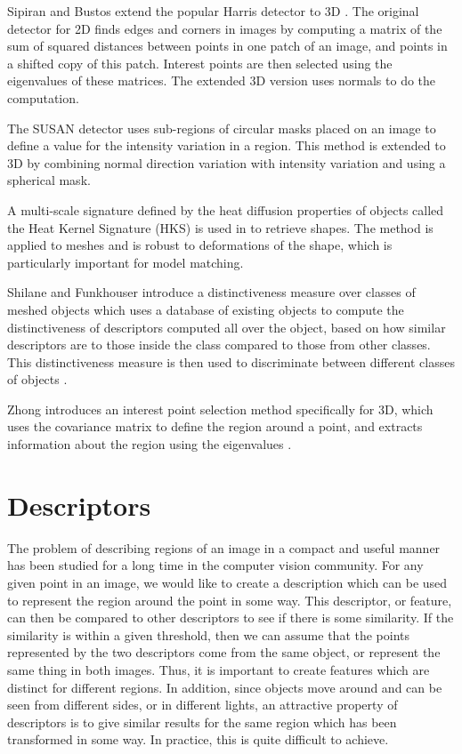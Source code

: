 \documentclass[11pt,a4paper]{kth-mag}
\begin{document}
Sipiran and Bustos extend the popular Harris detector \cite{harris1988combined}
to 3D \cite{sipiran2011harris}. The original detector for 2D finds edges and
corners in images by computing a matrix of the sum of squared distances between
points in one patch of an image, and points in a shifted copy of this patch.
Interest points are then selected using the eigenvalues of these matrices. The
extended 3D version uses normals to do the computation.

The SUSAN detector \cite{smith1997susan} uses sub-regions of circular masks
placed on an image to define a value for the intensity variation in a region.
This method is extended to 3D by combining normal direction variation with
intensity variation and using a spherical mask.

A multi-scale signature defined by the heat diffusion properties of objects 
called the Heat Kernel Signature (HKS) \cite{sun2009concise} is used in
\cite{ovsjanikov2009shape} to retrieve shapes. The method is applied to meshes
and is robust to deformations of the shape, which is particularly important for
model matching.

Shilane and Funkhouser introduce a distinctiveness measure over classes of
meshed objects which uses a database of existing objects to compute the
distinctiveness of descriptors computed all over the object, based on how
similar descriptors are to those inside the class compared to those from other
classes. This distinctiveness measure is then used to discriminate between
different classes of objects \cite{shilane2007distinctive}.

Zhong introduces an interest point selection method specifically for 3D, which
uses the covariance matrix to define the region around a point, and extracts
information about the region using the eigenvalues \cite{zhong2009intrinsic}.

\section{Descriptors}
The problem of describing regions of an image in a compact and useful manner has
been studied for a long time in the computer vision community. For any given
point in an image, we would like to create a description which can be used to
represent the region around the point in some way. This descriptor, or feature,
can then be compared to other descriptors to see if there is some similarity. If
the similarity is within a given threshold, then we can assume that the points
represented by the two descriptors come from the same object, or represent the
same thing in both images. Thus, it is important to create features which are
distinct for different regions. In addition, since objects move around and can
be seen from different sides, or in different lights, an attractive property of
descriptors is to give similar results for the same region which has been
transformed in some way. In practice, this is quite difficult to achieve.
\end{document}
